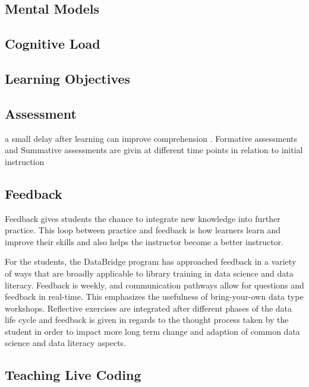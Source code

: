 \documentclass[../main.tex]{subfiles}
\begin{document}
        \subsection{Mental Models}
        
        \subsection{Cognitive Load}
        
        \subsection{Learning Objectives}
        
        \subsection{Assessment}
        
        a small delay after learning can improve comprehension
        \cite{andersonWhyDelayedSummaries2008,}.
        Formative assessments and Summative assessments are givin at different time points in relation to
        initial instruction
        
        \subsection{Feedback}
        
        Feedback gives students the chance to integrate new knowledge into further practice.
        This loop between practice and feedback is how learners learn and improve their skills and also helps the instructor become a better instructor.
        
For the students, the DataBridge program has approached feedback in a variety of ways that are broadly applicable to library training in data science and data literacy. Feedback is weekly, and communication pathways allow for questions and feedback in real-time. This emphasizes the usefulness of bring-your-own data type workshops. Reflective exercises are integrated after different phases of the data life cycle and feedback is given in regards to the thought process taken by the student in order to impact more long term change and adaption of common data science and data literacy aspects.

        \subsection{Teaching Live Coding}
        
\end{document}

